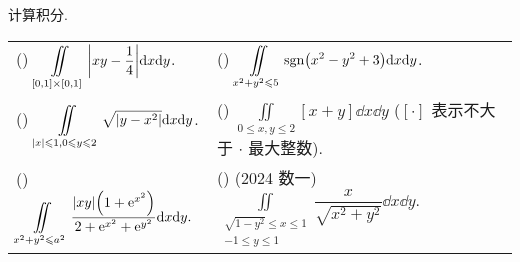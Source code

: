 \begin{example}
    计算积分.
    \setcounter{magicrownumbers}{0}
    \begin{table}[H]
        \centering
        \begin{tabular}{l | l}
            (\rownumber{}) $\displaystyle \iint\limits_{[0,1]\times [0,1]}\qty|xy-\dfrac{1}{4}|\dd x\dd y$.                                                       & (\rownumber{}) $\displaystyle\iint\limits_{x^2+y^2\leqslant 5}\mathrm{sgn}\qty(x^2-y^2+3)\dd x\dd y$.                           \\
            (\rownumber{}) $\displaystyle\iint\limits_{|x|\leqslant 1,0\leqslant y\leqslant 2}\sqrt{\qty|y-x^2|}\dd x\dd y$.                                      & (\rownumber{}) $\displaystyle \iint\limits_{0\leqslant x,y\leqslant 2}[x+y]\dd x\dd y$ ($[\cdot]$ 表示不大于 $\cdot$ 最大整数). \\
            (\rownumber{}) $\displaystyle\iint\limits_{x^2+y^2\leqslant a^2}\dfrac{|xy|\qty(1+\mathrm{e}^{x^2})}{2+\mathrm{e}^{x^2}+\mathrm{e}^{y^2}}\dd x\dd y.$ & (\rownumber{}) (2024 数一) $\displaystyle\iint\limits_{\substack{\sqrt{1-y^2}\leqslant x\leqslant 1                             \\-1\leqslant y\leqslant 1}}\dfrac{x}{\sqrt{x^2+y^2}}\dd x\dd y.$
        \end{tabular}
    \end{table}
\end{example}
